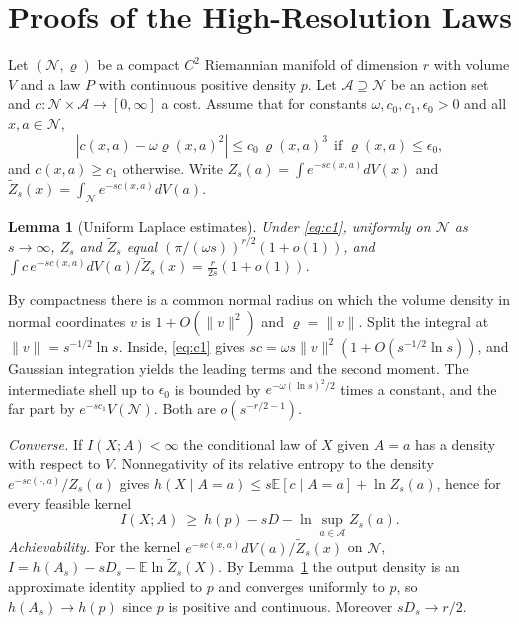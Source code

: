 \documentclass[10pt,journal]{IEEEtran}
\newtheorem{lemma}{Lemma}
\newcommand{\E}{\mathbb E}
\begin{document}
\section{Proofs of the High-Resolution Laws}\label{app:highres}
Let $(\mathcal N,\varrho)$ be a compact $C^2$ Riemannian manifold of dimension $r$ with volume $V$ and a law $P$ with continuous positive density $p$. Let $\mathcal A\supseteq\mathcal N$ be an action set and $c:\mathcal N\times\mathcal A\to[0,\infty]$ a cost. Assume that for constants $\omega,c_0,c_1,\epsilon_0>0$ and all $x,a\in\mathcal N$,
\begin{equation}
 |c(x,a)-\omega\varrho(x,a)^2|\le c_0\,\varrho(x,a)^3\ \ \text{if }\varrho(x,a)\le\epsilon_0, \label{eq:c1}
\end{equation}
and $c(x,a)\ge c_1$ otherwise. Write $Z_s(a)=\int e^{-sc(x,a)}dV(x)$ and $\tilde Z_s(x)=\int_{\mathcal N}e^{-sc(x,a)}dV(a)$.
\begin{lemma}[Uniform Laplace estimates]\label{lem:laplace}
Under \eqref{eq:c1}, uniformly on $\mathcal N$ as $s\to\infty$, $Z_s$ and $\tilde Z_s$ equal $(\pi/(\omega s))^{r/2}(1+o(1))$, and $\int c\,e^{-sc(x,a)}dV(a)/\tilde Z_s(x)=\frac{r}{2s}(1+o(1))$.
\end{lemma}
\begin{IEEEproof}
By compactness there is a common normal radius on which the volume density in normal coordinates $v$ is $1+O(\|v\|^2)$ and $\varrho=\|v\|$. Split the integral at $\|v\|=s^{-1/2}\ln s$. Inside, \eqref{eq:c1} gives $sc=\omega s\|v\|^2(1+O(s^{-1/2}\ln s))$, and Gaussian integration yields the leading terms and the second moment. The intermediate shell up to $\epsilon_0$ is bounded by $e^{-\omega(\ln s)^2/2}$ times a constant, and the far part by $e^{-sc_1}V(\mathcal N)$. Both are $o(s^{-r/2-1})$.
\end{IEEEproof}
\emph{Converse.} If $I(X;A)<\infty$ the conditional law of $X$ given $A=a$ has a density with respect to $V$. Nonnegativity of its relative entropy to the density $e^{-sc(\cdot,a)}/Z_s(a)$ gives $h(X\mid A=a)\le s\E[c\mid A=a]+\ln Z_s(a)$, hence for every feasible kernel
\begin{equation}
 I(X;A)\ \ge\ h(p)-sD-\ln\sup_{a\in\mathcal A}Z_s(a). \label{eq:app-lower}
\end{equation}
\emph{Achievability.} For the kernel $e^{-sc(x,a)}dV(a)/\tilde Z_s(x)$ on $\mathcal N$, $I=h(A_s)-sD_s-\E\ln\tilde Z_s(X)$. By Lemma~\ref{lem:laplace} the output density is an approximate identity applied to $p$ and converges uniformly to $p$, so $h(A_s)\to h(p)$ since $p$ is positive and continuous. Moreover $sD_s\to r/2$.
\end{document}
